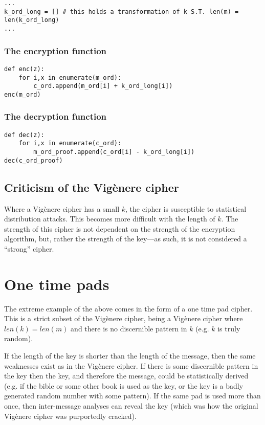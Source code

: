 \documentclass{AIAA}
\begin{document}
\begin{verbatim}
...
k_ord_long = [] # this holds a transformation of k S.T. len(m) = len(k_ord_long)
...
\end{verbatim}

\subsubsection{The encryption function}

\begin{verbatim}
def enc(z):
    for i,x in enumerate(m_ord):
        c_ord.append(m_ord[i] + k_ord_long[i])
enc(m_ord)
\end{verbatim}

\subsubsection{The decryption function}

\begin{verbatim}
def dec(z):
    for i,x in enumerate(c_ord):
        m_ord_proof.append(c_ord[i] - k_ord_long[i])
dec(c_ord_proof)
\end{verbatim}

\subsection{Criticism of the Vig\`enere cipher}
Where a Vig\`enere cipher has a small $k$, the cipher is susceptible to statistical distribution attacks. This becomes more difficult with the length of $k$. The strength of this cipher is not dependent on the strength of the encryption algorithm, but, rather the strength of the key---as such, it is not considered a ``strong'' cipher.

\section{One time pads}
The extreme example of the above comes in the form of a one time pad cipher. This is a strict subset of the Vig\`enere cipher, being a Vig\`enere cipher where $len(k) = len(m)$ and there is no discernible pattern in $k$ (e.g. $k$ is truly random).

If the length of the key is shorter than the length of the message, then the same weaknesses exist as in the Vig\`enere cipher. If there is some discernible pattern in the key then the key, and therefore the message, could be statistically derived (e.g. if the bible or some other book is used as the key, or the key is a badly generated random number with some pattern). If the same pad is used more than once, then inter-message analyses can reveal the key (which was how the original Vig\`enere cipher was purportedly cracked).
\end{document}
